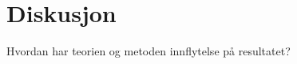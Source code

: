 \documentclass[a4paper]{report}
\begin{document}
    \chapter{Diskusjon}
    Hvordan har teorien og metoden innflytelse på resultatet?
    
    
\end{document}
